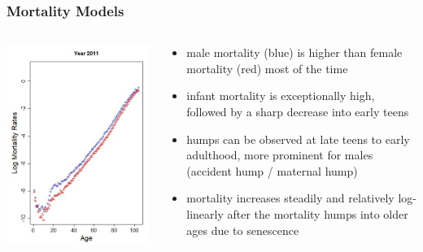 \documentclass[hyperref={colorlinks, citecolor=blue}]{beamer}
\begin{document}
\begin{frame}
\frametitle{Mortality Models}
\begin{columns}
\begin{column}{0.4\linewidth}
\includegraphics[width=\linewidth]{Graphs/crude mort rates 2011.jpg}
\end{column}
\begin{column}{0.7\linewidth}
\begin{itemize}
\item male mortality (blue) is higher than female mortality (red) most of the time
\item infant mortality is exceptionally high, followed by a sharp decrease into early teens
\item humps can be observed at late teens to early adulthood, more prominent for males (accident hump / maternal hump)
\item mortality increases steadily and relatively log-linearly after the mortality humps into older ages due to senescence
\end{itemize}
\end{column}
\end{columns}
\end{frame}
\end{document}
